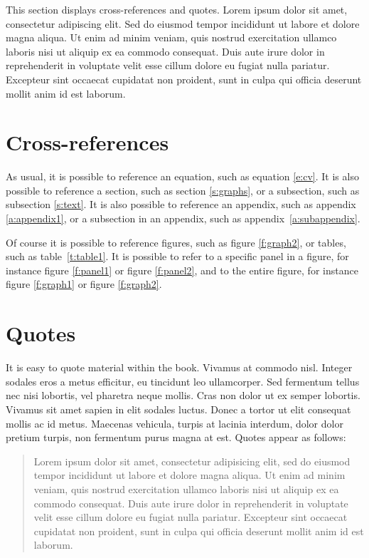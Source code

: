 This section displays cross-references and quotes. Lorem ipsum dolor sit amet, consectetur adipiscing elit. Sed do eiusmod tempor incididunt ut labore et dolore magna aliqua. Ut enim ad minim veniam, quis nostrud exercitation ullamco laboris nisi ut aliquip ex ea commodo consequat. Duis aute irure dolor in reprehenderit in voluptate velit esse cillum dolore eu fugiat nulla pariatur. Excepteur sint occaecat cupidatat non proident, sunt in culpa qui officia deserunt mollit anim id est laborum.

\section{Cross-references}

As usual, it is possible to reference an equation, such as equation \eqref{e:cv}. It is also possible to reference a section, such as section \ref{s:graphs}, or a subsection, such as subsection \ref{s:text}. It is also possible to reference an appendix, such as appendix \ref{a:appendix1}, or a subsection in an appendix, such as appendix~\ref{a:subappendix}. 

Of course it is possible to reference figures, such as figure \ref{f:graph2}, or tables, such as table~\ref{t:table1}. It is possible to refer to a specific panel in a figure, for instance figure \ref{f:panel1} or figure \ref{f:panel2}, and to the entire figure, for instance figure \ref{f:graph1} or figure \ref{f:graph2}.

\section{Quotes}

It is easy to quote material within the book. Vivamus at commodo nisl. Integer sodales eros a metus efficitur, eu tincidunt leo ullamcorper. Sed fermentum tellus nec nisi lobortis, vel pharetra neque mollis. Cras non dolor ut ex semper lobortis. Vivamus sit amet sapien in elit sodales luctus. Donec a tortor ut elit consequat mollis ac id metus. Maecenas vehicula, turpis at lacinia interdum, dolor dolor pretium turpis, non fermentum purus magna at est. Quotes appear as follows:

\begin{quote}
Lorem ipsum dolor sit amet, consectetur adipisicing elit, sed do eiusmod
tempor incididunt ut labore et dolore magna aliqua. Ut enim ad minim veniam,
quis nostrud exercitation ullamco laboris nisi ut aliquip ex ea commodo
consequat. Duis aute irure dolor in reprehenderit in voluptate velit esse
cillum dolore eu fugiat nulla pariatur. Excepteur sint occaecat cupidatat non
proident, sunt in culpa qui officia deserunt mollit anim id est laborum.
\end{quote}

